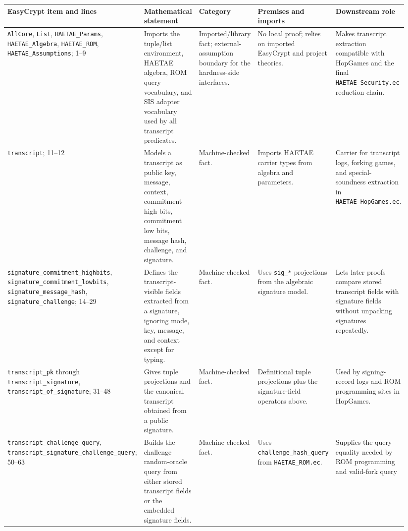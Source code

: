 \documentclass[11pt]{report}
\DeclareRobustCommand{\file}[1]{\ifmmode\text{\nolinkurl{#1}}\else\nolinkurl{#1}\fi}
\DeclareRobustCommand{\ec}[1]{\ifmmode\text{\nolinkurl{#1}}\else\nolinkurl{#1}\fi}
\theoremstyle{definition}
\theoremstyle{plain}
\begin{document}
\begin{longtable}{p{0.20\linewidth}p{0.25\linewidth}p{0.16\linewidth}p{0.18\linewidth}p{0.15\linewidth}}
\toprule
\textbf{EasyCrypt item and lines} & \textbf{Mathematical statement} &
\textbf{Category} & \textbf{Premises and imports} & \textbf{Downstream role} \\
\midrule
\ec{AllCore}, \ec{List}, \ec{HAETAE\_Params}, \ec{HAETAE\_Algebra},
\ec{HAETAE\_ROM}, \ec{HAETAE\_Assumptions}; 1--9 &
Imports the tuple/list environment, HAETAE algebra, ROM query vocabulary, and
SIS adapter vocabulary used by all transcript predicates. &
Imported/library fact; external-assumption boundary for the hardness-side
interfaces. &
No local proof; relies on imported EasyCrypt and project theories. &
Makes transcript extraction compatible with HopGames and the final
\file{HAETAE\_Security.ec} reduction chain. \\
\midrule
\ec{transcript}; 11--12 &
Models a transcript as public key, message, context, commitment high bits,
commitment low bits, message hash, challenge, and signature. &
Machine-checked fact. &
Imports HAETAE carrier types from algebra and parameters. &
Carrier for transcript logs, forking games, and special-soundness extraction
in \file{HAETAE\_HopGames.ec}. \\
\midrule
\ec{signature\_commitment\_highbits},
\ec{signature\_commitment\_lowbits}, \ec{signature\_message\_hash},
\ec{signature\_challenge}; 14--29 &
Defines the transcript-visible fields extracted from a signature, ignoring
mode, key, message, and context except for typing. &
Machine-checked fact. &
Uses \ec{sig\_*} projections from the algebraic signature model. &
Lets later proofs compare stored transcript fields with signature fields
without unpacking signatures repeatedly. \\
\midrule
\ec{transcript\_pk} through \ec{transcript\_signature},
\ec{transcript\_of\_signature}; 31--48 &
Gives tuple projections and the canonical transcript obtained from a public
signature. &
Machine-checked fact. &
Definitional tuple projections plus the signature-field operators above. &
Used by signing-record logs and ROM programming sites in HopGames. \\
\midrule
\ec{transcript\_challenge\_query},
\ec{transcript\_signature\_challenge\_query}; 50--63 &
Builds the challenge random-oracle query from either stored transcript fields
or the embedded signature fields. &
Machine-checked fact. &
Uses \ec{challenge\_hash\_query} from \file{HAETAE\_ROM.ec}. &
Supplies the query equality needed by ROM programming and valid-fork query

\end{longtable}
\end{document}
